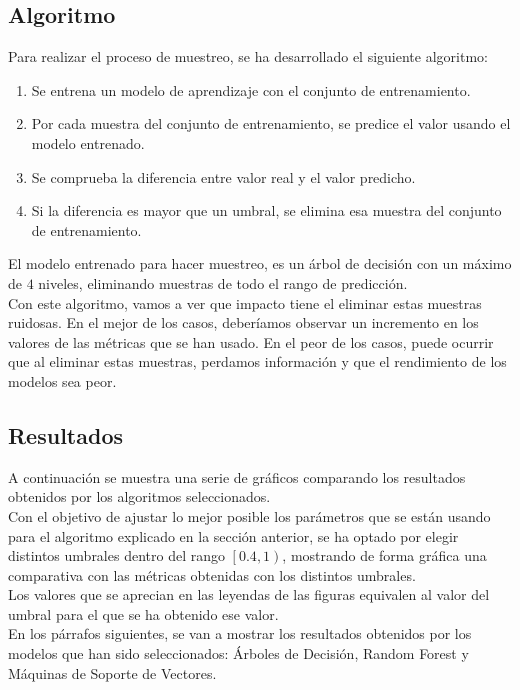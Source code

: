 \subsection{Algoritmo}
Para realizar el proceso de muestreo, se ha desarrollado el siguiente algoritmo:
\begin{enumerate}
	\item Se entrena un modelo de aprendizaje con el conjunto de entrenamiento.
	\item Por cada muestra del conjunto de entrenamiento, se predice el valor usando el modelo entrenado.
	\item Se comprueba la diferencia entre valor real y el valor predicho.
	\item Si la diferencia es mayor que un umbral, se elimina esa muestra del conjunto de entrenamiento.
\end{enumerate}
El modelo entrenado para hacer muestreo, es un árbol de decisión con un máximo de $4$ niveles, eliminando muestras de todo el rango de predicción.\\
\linebreak
Con este algoritmo, vamos a ver que impacto tiene el eliminar estas muestras ruidosas. En el mejor de los casos, deberíamos observar un incremento en los valores de las métricas que se han usado. En el peor de los casos, puede ocurrir que al eliminar estas muestras, perdamos información y que el rendimiento de los modelos sea peor.
\clearpage
\subsection{Resultados}
A continuación se muestra una serie de gráficos comparando los resultados obtenidos por los algoritmos seleccionados.\\
\linebreak
Con el objetivo de ajustar lo mejor posible los parámetros que se están usando para el algoritmo explicado en la sección anterior, se ha optado por elegir distintos umbrales dentro del rango $\left[0.4,1\right)$, mostrando de forma gráfica una comparativa con las métricas obtenidas con los distintos umbrales.\\
Los valores que se aprecian en las leyendas de las figuras equivalen al valor del umbral para el que se ha obtenido ese valor.\\
\linebreak
En los párrafos siguientes, se van a mostrar los resultados obtenidos por los modelos que han sido seleccionados: Árboles de Decisión, Random Forest y Máquinas de Soporte de Vectores.
